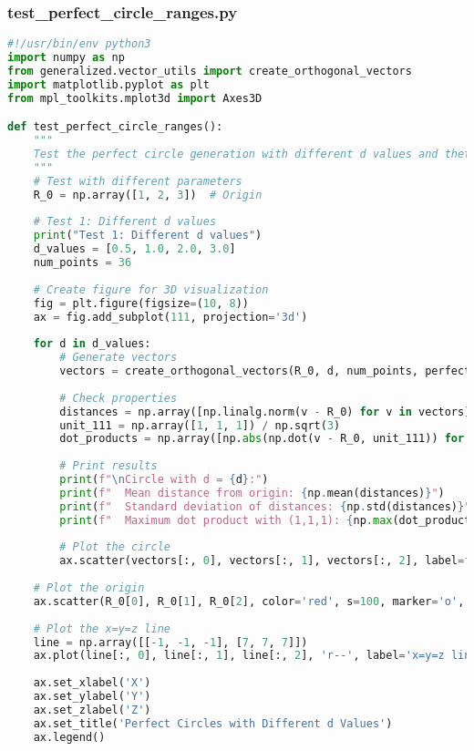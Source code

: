 \subsubsection{test\_perfect\_circle\_ranges.py}

\begin{lstlisting}[language=Python]
#!/usr/bin/env python3
import numpy as np
from generalized.vector_utils import create_orthogonal_vectors
import matplotlib.pyplot as plt
from mpl_toolkits.mplot3d import Axes3D

def test_perfect_circle_ranges():
    """
    Test the perfect circle generation with different d values and theta ranges
    """
    # Test with different parameters
    R_0 = np.array([1, 2, 3])  # Origin
    
    # Test 1: Different d values
    print("Test 1: Different d values")
    d_values = [0.5, 1.0, 2.0, 3.0]
    num_points = 36
    
    # Create figure for 3D visualization
    fig = plt.figure(figsize=(10, 8))
    ax = fig.add_subplot(111, projection='3d')
    
    for d in d_values:
        # Generate vectors
        vectors = create_orthogonal_vectors(R_0, d, num_points, perfect=True)
        
        # Check properties
        distances = np.array([np.linalg.norm(v - R_0) for v in vectors])
        unit_111 = np.array([1, 1, 1]) / np.sqrt(3)
        dot_products = np.array([np.abs(np.dot(v - R_0, unit_111)) for v in vectors])
        
        # Print results
        print(f"\nCircle with d = {d}:")
        print(f"  Mean distance from origin: {np.mean(distances)}")
        print(f"  Standard deviation of distances: {np.std(distances)}")
        print(f"  Maximum dot product with (1,1,1): {np.max(dot_products)}")
        
        # Plot the circle
        ax.scatter(vectors[:, 0], vectors[:, 1], vectors[:, 2], label=f'd = {d}')
    
    # Plot the origin
    ax.scatter(R_0[0], R_0[1], R_0[2], color='red', s=100, marker='o', label='Origin R_0')
    
    # Plot the x=y=z line
    line = np.array([[-1, -1, -1], [7, 7, 7]])
    ax.plot(line[:, 0], line[:, 1], line[:, 2], 'r--', label='x=y=z line')
    
    ax.set_xlabel('X')
    ax.set_ylabel('Y')
    ax.set_zlabel('Z')
    ax.set_title('Perfect Circles with Different d Values')
    ax.legend()
    

\end{lstlisting}
